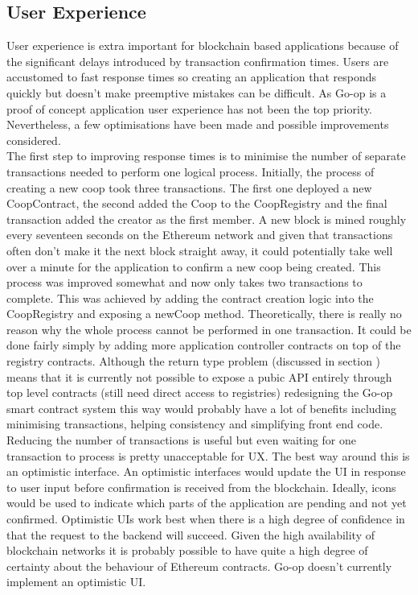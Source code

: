 \subsection{User Experience}
User experience is extra important for blockchain based applications because of the significant delays introduced by transaction confirmation times. Users are accustomed to fast response times so creating an application that responds quickly but doesn't make preemptive mistakes can be difficult. As Go-op is a proof of concept application user experience has not been the top priority. Nevertheless, a few optimisations have been made and possible improvements considered.\\

The first step to improving response times is to minimise the number of separate transactions needed to perform one logical process. Initially, the process of creating a new coop took three transactions. The first one deployed a new CoopContract, the second added the Coop to the CoopRegistry and the final transaction added the creator as the first member. A new block is mined roughly every seventeen seconds on the Ethereum network and given that transactions often don't make it the next block straight away, it could potentially take well over a minute for the application to confirm a new coop being created. This process was improved somewhat and now only takes two transactions to complete. This was achieved by adding the contract creation logic into the CoopRegistry and exposing a newCoop method. Theoretically, there is really no reason why the whole process cannot be performed in one transaction. It could be done fairly simply by adding more application controller contracts on top of the registry contracts. Although the return type problem (discussed in section ) means that it is currently not possible to expose a pubic API entirely through top level contracts (still need direct access to registries) redesigning the Go-op smart contract system this way would probably have a lot of benefits including minimising transactions, helping consistency and simplifying front end code.\\

Reducing the number of transactions is useful but even waiting for one transaction to process is pretty unacceptable for UX. The best way around this is an optimistic interface. An optimistic interfaces would update the UI in response to user input before confirmation is received from the blockchain. Ideally, icons would be used to indicate which parts of the application are pending and not yet confirmed. Optimistic UIs work best when there is a high degree of confidence in that the request to the backend will succeed. Given the high availability of blockchain networks it is probably possible to have quite a high degree of certainty about the behaviour of Ethereum contracts. Go-op doesn't currently implement an optimistic UI.\\

